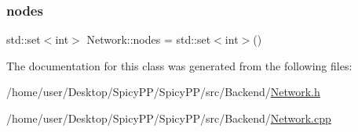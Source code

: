 \subsubsection{\texorpdfstring{nodes}{nodes}}
{\footnotesize\ttfamily std\+::set$<$int$>$ Network\+::nodes = std\+::set$<$int$>$()\hspace{0.3cm}{\ttfamily [private]}}



The documentation for this class was generated from the following files\+:\begin{DoxyCompactItemize}
\item 
/home/user/\+Desktop/\+Spicy\+P\+P/\+Spicy\+P\+P/src/\+Backend/\hyperlink{Network_8h}{Network.\+h}\item 
/home/user/\+Desktop/\+Spicy\+P\+P/\+Spicy\+P\+P/src/\+Backend/\hyperlink{Network_8cpp}{Network.\+cpp}\end{DoxyCompactItemize}
